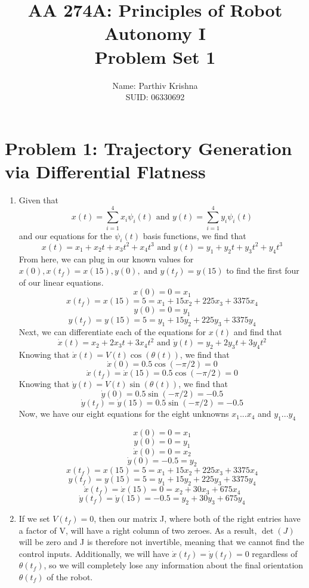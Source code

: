 \documentclass{article}
\title{AA 274A: Principles of Robot Autonomy I \\ Problem Set 1}
\author{Name: Parthiv Krishna \\ SUID: 06330692}
\date{}
\begin{document}
\maketitle
\pagestyle{fancy} 

\section*{Problem 1: Trajectory Generation via Differential Flatness}
\begin{enumerate}[label=(\roman*)]
\item Given that 
$$x(t)=\sum_{i=1}^{4}x_i\psi_i(t) \text{ and } y(t)=\sum_{i=1}^{4}y_i\psi_i(t)$$ 
and our equations for the $\psi_i(t)$ basis functions, we find that 
$$x(t)=x_1 + x_2t + x_3t^2 + x_4t^3 \text{ and } y(t)=y_1 + y_2t + y_3t^2 + y_4t^3$$ 
From here, we can plug in our known values for $x(0), x(t_f)=x(15), y(0), \text{ and } y(t_f)=y(15)$ to find the first four of our linear equations.
$$x(0) = 0 = x_1$$
$$x(t_f) = x(15) = 5 = x_1 + 15x_2 + 225x_3 + 3375x_4$$
$$y(0) = 0 = y_1$$
$$y(t_f) = y(15) = 5 = y_1 + 15y_2 + 225y_3 + 3375y_4$$
Next, we can differentiate each of the equations for $x(t)$ and find that 
$$\dot{x}(t) = x_2 + 2x_3t + 3x_4t^2 \text{ and } \dot{y}(t) = y_2 + 2y_3t + 3y_4t^2$$
Knowing that $\dot{x}(t) = V(t)\cos(\theta(t))$, we find that 
$$\dot{x}(0) = 0.5\cos(-\pi/2) = 0$$
$$\dot{x}(t_f)=\dot{x}(15)=0.5\cos(-\pi/2) = 0$$ 
Knowing that $\dot{y}(t) = V(t)\sin(\theta(t))$, we find that
$$\dot{y}(0) = 0.5\sin(-\pi/2) = -0.5$$ 
$$\dot{y}(t_f)=\dot{y}(15)=0.5\sin(-\pi/2) = -0.5$$
Now, we have our eight equations for the eight unknowns $x_1 ... x_4$ and $y_1 ... y_4$

\begin{framed}
$$x(0) = 0 = x_1$$ 
$$y(0) = 0 = y_1$$
$$\dot{x}(0) = 0 = x_2$$
$$\dot{y}(0) = -0.5 = y_2$$
$$x(t_f) = x(15) = 5 = x_1 + 15x_2 + 225x_3 + 3375x_4$$
$$y(t_f) = y(15) = 5 = y_1 + 15y_2 + 225y_3 + 3375y_4$$
$$\dot{x}(t_f) = \dot{x}(15) = 0 = x_2 + 30x_3 + 675x_4$$
$$\dot{y}(t_f) = \dot{y}(15) = -0.5 = y_2 + 30y_3 + 675y_4$$
\end{framed}

\item If we set $V(t_f) = 0$, then our matrix J, where both of the right entries have a factor of V, will have a right column of two zeroes. As a result, $\det(J)$ will be zero and J is therefore not invertible, meaning that we cannot find the control inputs. Additionally, we will have $\dot{x}(t_f) = \dot{y}(t_f) = 0$ regardless of $\theta(t_f)$, so we will completely lose any information about the final orientation $\theta(t_f)$ of the robot.


\end{enumerate}
\end{document}
